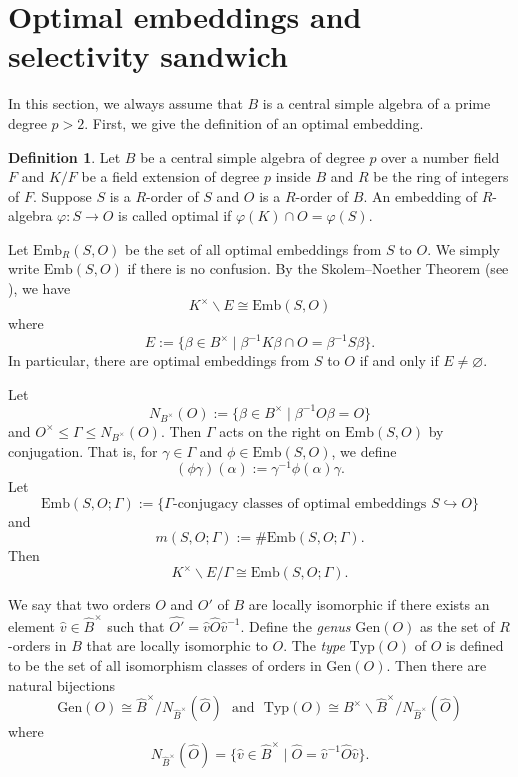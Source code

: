 \documentclass[12pt]{article}
\theoremstyle{plain}
\theoremstyle{definition}
\newtheorem{definition}{Definition}[section]
\theoremstyle{remark}
\begin{document}
\section{Optimal embeddings and selectivity sandwich}
In this section, we always assume that $B$ is a central simple algebra of a prime degree $p>2$. First, we give the definition of an optimal embedding.

\begin{definition}
Let $B$ be a central simple algebra of degree $p$ over a number field $F$ and $K/F$ be a field extension of degree $p$ inside $B$ and $R$ be the ring of integers of $F$. Suppose $S$ is a $R$-order of $S$ and $O$ is a $R$-order of $B$. An embedding of $R$-algebra $\varphi:S\to O$ is called  optimal if $\varphi(K)\cap O=\varphi(S)$.
\end{definition}
Let 
$\mathrm{Emb}_R(S,O)$ be the set of all optimal embeddings from $S$ to $O$. 
We simply write $\mathrm{Emb}(S,O)$ if there is no confusion.
By the Skolem–Noether Theorem (see \cite[Main Theorem 7.7.1]{voight2021quaternion}), we have $$K^\times\backslash E\cong \mathrm{Emb}(S,O)$$ where 
$$E:=\{\beta\in B^\times\mid \beta^{-1}K\beta\cap O= \beta^{-1}S\beta\}. $$
In particular, there are optimal embeddings from $S$ to $O$ if and only if $E\neq \varnothing$. 

Let 
$$N_{B^\times}(O):=\{\beta\in B^\times\mid \beta^{-1}O\beta=O\}$$ and 
$O^\times\leq \Gamma\leq N_{B^\times}(O)$. Then $\Gamma$ acts on the right on $\mathrm{Emb}(S,O)$ by conjugation. That is, for $\gamma \in \Gamma$ and $\phi \in \mathrm{Emb}(S,O)$, we define
$$(\phi\gamma)(\alpha):=\gamma^{-1}\phi(\alpha)\gamma . $$
Let
$$\mathrm{Emb}(S,O;\Gamma):=\{\Gamma\text{-conjugacy classes of optimal embeddings } S\hookrightarrow O\}$$
and 
$$m(S,O;\Gamma):=\#\mathrm{Emb}(S,O;\Gamma). $$
Then $$K^\times\backslash E/\Gamma\cong \mathrm{Emb}(S,O;\Gamma) . $$

We say that two orders $O$ and $O'$ of $B$ are locally isomorphic if there exists an element $\widehat{v}\in \widehat{B}^\times$ such that $\widehat{O'}=\widehat{v}\widehat{O}\widehat{v}^{-1}$. 
Define the \textit{genus} $\mathrm{Gen} (O)$ as the set of $R$-orders in $B$ that are locally isomorphic to $O$. The \textit{type} $\mathrm{Typ} (O)$ of $O$ is defined to be the set of all isomorphism classes of orders in $\mathrm{Gen} (O)$. Then there are natural bijections 
$$\mathrm{Gen} (O) \cong \widehat{B}^\times/N_{\widehat{B}^\times}(\widehat{O}) \ \ \ \text{and} \ \ \ \mathrm{Typ} (O) \cong B^\times\backslash\widehat{B}^\times/N_{\widehat{B}^\times}(\widehat{O})$$ where 
$$ N_{\widehat{B}^\times}(\widehat{O})= \{\widehat{v} \in  \widehat{B}^\times\mid\widehat{O}=\widehat{v}^{-1}\widehat{O}\widehat{v} \} . $$
\end{document}

